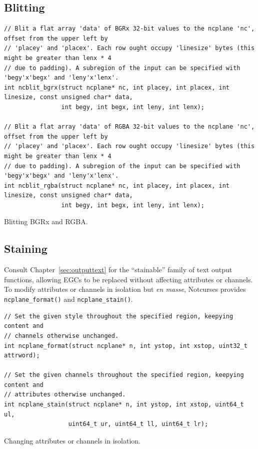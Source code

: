 \documentclass[letterpaper,10pt]{article}
\begin{document}
\subsection{Blitting}
\label{sec:blitting}
\begin{listing}[!htbp]
\begin{verbatim}
// Blit a flat array 'data' of BGRx 32-bit values to the ncplane 'nc', offset from the upper left by
// 'placey' and 'placex'. Each row ought occupy 'linesize' bytes (this might be greater than lenx * 4
// due to padding). A subregion of the input can be specified with 'begy'x'begx' and 'leny'x'lenx'.
int ncblit_bgrx(struct ncplane* nc, int placey, int placex, int linesize, const unsigned char* data,
                int begy, int begx, int leny, int lenx);

// Blit a flat array 'data' of RGBA 32-bit values to the ncplane 'nc', offset from the upper left by
// 'placey' and 'placex'. Each row ought occupy 'linesize' bytes (this might be greater than lenx * 4
// due to padding). A subregion of the input can be specified with 'begy'x'begx' and 'leny'x'lenx'.
int ncblit_rgba(struct ncplane* nc, int placey, int placex, int linesize, const unsigned char* data,
                int begy, int begx, int leny, int lenx);
\end{verbatim}
\caption{Blitting BGRx and RGBA.}
\label{list:blitting}
\end{listing}

\subsection{Staining}
\label{sec:staining}
Consult Chapter~\ref{sec:outputtext} for the ``stainable'' family of text output
functions, allowing EGCs to be replaced without affecting attributes or channels.
To modify attributes or channels in isolation but \textit{en masse}, Notcurses
provides \texttt{ncplane\_format()} and \texttt{ncplane\_stain()}.

\begin{listing}[!htbp]
\begin{verbatim}
// Set the given style throughout the specified region, keepying content and
// channels otherwise unchanged.
int ncplane_format(struct ncplane* n, int ystop, int xstop, uint32_t attrword);

// Set the given channels throughout the specified region, keepying content and
// attributes otherwise unchanged.
int ncplane_stain(struct ncplane* n, int ystop, int xstop, uint64_t ul,
                  uint64_t ur, uint64_t ll, uint64_t lr);
\end{verbatim}
\caption{Changing attributes or channels in isolation.}
\label{list:stain}
\end{listing}
\end{document}
